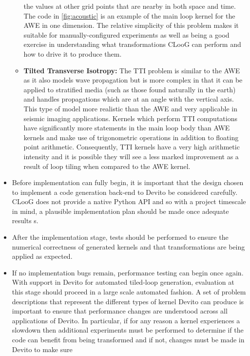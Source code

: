 \documentclass[a4paper,12pt,twoside]{report}
\begin{document}
\begin{itemize}
\begin{itemize}
                the values at other grid points that are nearby in both space and time. The code in \ref{fig:acoustic} is an example of the main loop kernel for the AWE 
                in one dimension. The relative simplicity of this problem makes it suitable for manually-configured experiments as well as being a good exercise 
                in understanding what transformations CLooG can perform and how to drive it to produce them.
            \item \textbf{Tilted Transverse Isotropy:} The TTI problem is similar to the AWE as it also models wave propagation but is more complex in that it can be
                applied to stratified media (such as those found naturally in the earth) and handles propagations which are at an angle with the vertical axis. This
                type of model more realistic than the AWE and very applicable in seismic imaging applications. Kernels which perform TTI computations
                have significantly more statements in the main loop body than AWE kernels and make use of trigonometric operations in addition to floating point 
                arithmetic. Consequently, TTI kernels have a very high arithmetic intensity and it is possible they will see a less marked improvement as a result
                of loop tiling when compared to the AWE kernel.
        \end{itemize}
    \item Before implementation can fully begin, it is important that the design chosen to implement a code generation back-end to Devito be considered carefully.
        CLooG does not provide a native Python API and so with a project timescale in mind, a plausible implementation plan should be made once adequate results s.
    \item After the implementation stage, tests should be performed to ensure the numerical correctness of generated kernels and that transformations are
        being applied as expected.
    \item If no implementation bugs remain, performance testing can begin once again. With support in Devito for automated tiled-loop generation, evaluation at this
        stage should proceed in a large scale automated fashion. A set of problem descriptions that represent the different types of kernel Devito can produce is
        important to ensure that performance changes are understood across all applications of Devito. In particular, if for any reason a kernel experiences a slowdown
        then additional experiments must be performed to determine if the code can benefit from being transformed and if not, changes must be made in Devito to make sure

\end{itemize}
\end{document}
